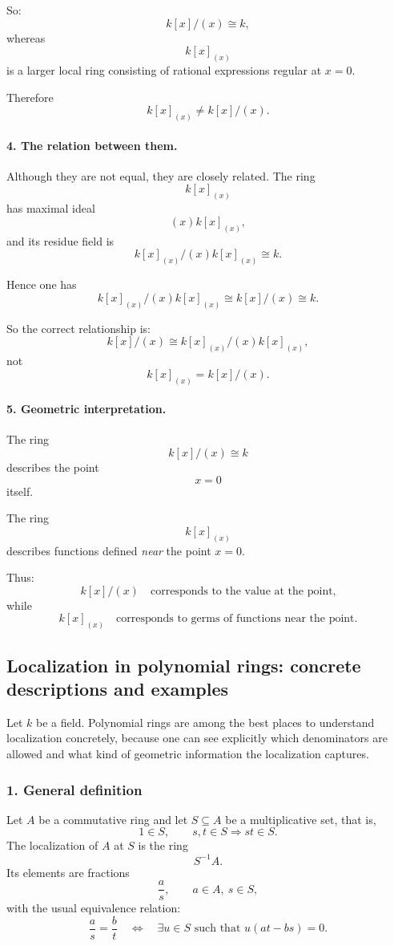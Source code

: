 \documentclass[12pt,a4paper]{article}
\theoremstyle{notespace}
\theoremstyle{definition}
\begin{document}
So:
\[
k[x]/(x)\cong k,
\]
whereas
\[
k[x]_{(x)}
\]
is a larger local ring consisting of rational expressions regular at \(x=0\).

Therefore
\[
k[x]_{(x)}\neq k[x]/(x).
\]

\paragraph{4. The relation between them.}

Although they are not equal, they are closely related. The ring
\[
k[x]_{(x)}
\]
has maximal ideal
\[
(x)k[x]_{(x)},
\]
and its residue field is
\[
k[x]_{(x)}/(x)k[x]_{(x)}\cong k.
\]

Hence one has
\[
k[x]_{(x)}/(x)k[x]_{(x)}
\cong
k[x]/(x)
\cong
k.
\]

So the correct relationship is:
\[
k[x]/(x)
\cong
k[x]_{(x)}/(x)k[x]_{(x)},
\]
not
\[
k[x]_{(x)}=k[x]/(x).
\]

\paragraph{5. Geometric interpretation.}

The ring
\[
k[x]/(x)\cong k
\]
describes the point
\[
x=0
\]
itself.

The ring
\[
k[x]_{(x)}
\]
describes functions defined \emph{near} the point \(x=0\).

Thus:
\[
k[x]/(x)
\quad\text{corresponds to the value at the point,}
\]
while
\[
k[x]_{(x)}
\quad\text{corresponds to germs of functions near the point.}
\]

\subsection{Localization in polynomial rings: concrete descriptions and examples}

Let \(k\) be a field. Polynomial rings are among the best places to understand localization concretely, because one can see explicitly which denominators are allowed and what kind of geometric information the localization captures.

\subsubsection{1. General definition}

Let \(A\) be a commutative ring and let \(S\subseteq A\) be a multiplicative set, that is,
\[
1\in S,
\qquad
s,t\in S \Longrightarrow st\in S.
\]
The localization of \(A\) at \(S\) is the ring
\[
S^{-1}A.
\]
Its elements are fractions
\[
\frac{a}{s},
\qquad
a\in A,\ s\in S,
\]
with the usual equivalence relation:
\[
\frac{a}{s}=\frac{b}{t}
\quad\Longleftrightarrow\quad
\exists u\in S \text{ such that } u(at-bs)=0.
\]
\end{document}
